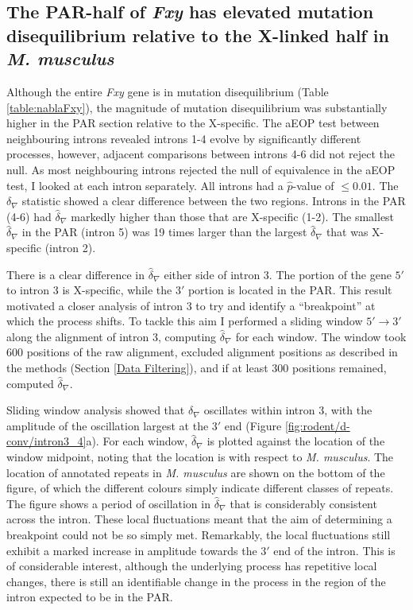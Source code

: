 \subsection{The PAR-half of \textit{Fxy} has elevated mutation disequilibrium relative to the X-linked half in \textit{M. musculus}}
\label{Fxy_TOE}

Although the entire \textit{Fxy} gene is in mutation disequilibrium (Table \ref{table:nablaFxy}), the magnitude of mutation disequilibrium was substantially higher in the PAR section relative to the X-specific. The aEOP test between neighbouring introns revealed introns 1-4 evolve by significantly different processes, however, adjacent comparisons between introns 4-6 did not reject the null. As most neighbouring introns rejected the null of equivalence in the aEOP test, I looked at each intron separately. All introns had a $\hat p$-value of $\leq 0.01$. The $\delta_\nabla$ statistic showed a clear difference between the two regions. Introns in the PAR (4-6) had $\hat\delta_\nabla$ markedly higher than those that are X-specific (1-2). The smallest $\hat \delta_\nabla$ in the PAR (intron 5) was 19 times larger than the largest $\hat \delta_\nabla$ that was X-specific (intron 2).



There is a clear difference in $\hat \delta_\nabla$ either side of intron 3. The portion of the gene $5'$ to intron 3 is X-specific, while the $3'$ portion is located in the PAR. This result motivated a closer analysis of intron 3 to try and identify a ``breakpoint'' at which the process shifts. To tackle this aim I performed a sliding window $5' \rightarrow 3'$ along the alignment of intron 3, computing $\hat \delta_\nabla$ for each window. The window took $600$ positions of the raw alignment, excluded alignment positions as described in the methods (Section \ref{Data Filtering}), and if at least 300 positions remained, computed $\hat \delta_\nabla$. 

Sliding window analysis showed that $\delta_\nabla$ oscillates within intron 3, with the amplitude of the oscillation largest at the $3'$ end (Figure \ref{fig:rodent/d-conv/intron3_4}a). For each window, $\hat \delta_\nabla$ is plotted against the location of the window midpoint, noting that the location is with respect to \textit{M. musculus}. The location of annotated repeats in \textit{M. musculus} are shown on the bottom of the figure, of which the different colours simply indicate different classes of repeats. The figure shows a period of oscillation in $\hat \delta_\nabla$ that is considerably consistent across the intron. These local fluctuations meant that the aim of determining a breakpoint could not be so simply met. Remarkably, the local fluctuations still exhibit a marked increase in amplitude towards the $3'$ end of the intron. This is of considerable interest, although the underlying process has repetitive local changes, there is still an identifiable change in the process in the region of the intron expected to be in the PAR. 

